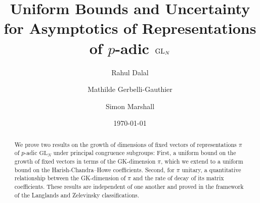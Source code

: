 \documentclass{amsart}
\title[Uniform Bounds and Uncertainty]{Uniform Bounds and Uncertainty for Asymptotics of Representations of $p$-adic $\GL_N$ %
}
\author{Rahul Dalal}
\author{Mathilde Gerbelli-Gauthier}
\author{Simon Marshall}
\date{\today}
\newcommand{\GL}{\mathrm{GL}}
\newcommand{\1}{\m 1}
\theoremstyle{remark}
\theoremstyle{definition}
\numberwithin{equation}{subsection}
\begin{document}
\begin{abstract}
We prove two results on the growth of dimensions of fixed vectors of representations $\pi$ of $p$-adic $\GL_N$ under principal congruence subgroups: First, a uniform bound on the growth of fixed vectors in terms of the GK-dimension $\pi$, which we extend to a uniform bound on the Harish-Chandra--Howe coefficients. Second, for $\pi$ unitary, a quantitative relationship between the GK-dimension of $\pi$ and the rate of decay of its matrix coefficients. These results are independent of one another and proved in the framework of the Langlands and Zelevinsky classifications. 
\end{abstract}

\maketitle

\end{document}
